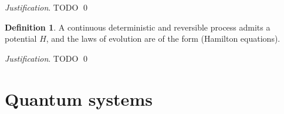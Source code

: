 \documentclass[aps,pra,10pt,twocolumn,floatfix,nofootinbib]{revtex4-1}
\theoremstyle{definition}
\newtheorem{defn}[prop]{Definition}
\newenvironment{justification}{\emph{Justification}.}{\qed}
\begin{document}
\begin{justification}
	TODO
\end{justification}

\begin{defn}\label{hamiltonian}
	A continuous deterministic and reversible process admits a potential $H$, and the laws of evolution are of the form (Hamilton equations).
\end{defn}

\begin{justification}
	TODO
\end{justification}



\section{Quantum systems}



\end{document}
